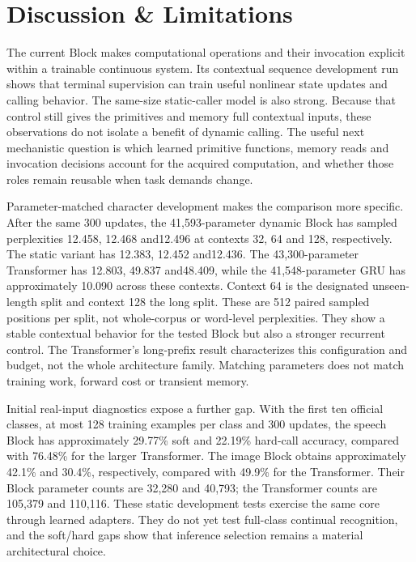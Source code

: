 \section{Discussion \& Limitations}
\label{sec:discussion}

The current Block makes computational operations and their invocation explicit
within a trainable continuous system. Its contextual sequence development run
shows that terminal supervision can train useful nonlinear state updates and
calling behavior. The same-size static-caller model is also strong. Because
that control still gives the primitives and memory full contextual inputs,
these observations do not isolate a benefit of dynamic calling. The useful
next mechanistic question is which learned primitive functions, memory reads
and invocation decisions account for the acquired computation, and whether
those roles remain reusable when task demands change.

Parameter-matched character development makes the comparison more specific.
After the same 300 updates, the 41,593-parameter dynamic Block has sampled
perplexities 12.458, 12.468 and12.496 at contexts 32, 64 and 128, respectively.
The static variant has 12.383, 12.452 and12.436. The 43,300-parameter Transformer
has 12.803, 49.837 and48.409, while the 41,548-parameter GRU has approximately
10.090 across these contexts. Context 64 is the designated unseen-length split
and context 128 the long split. These are 512 paired sampled positions per split,
not whole-corpus or word-level perplexities. They show a stable contextual
behavior for the tested Block but also a stronger recurrent control. The
Transformer's long-prefix result characterizes this configuration and budget,
not the whole architecture family. Matching parameters does not match
training work, forward cost or transient memory.

Initial real-input diagnostics expose a further gap. With the first ten
official classes, at most 128 training examples per class and 300 updates,
the speech Block has approximately 29.77\% soft and 22.19\% hard-call accuracy,
compared with 76.48\% for the larger Transformer. The image Block obtains
approximately 42.1\% and 30.4\%, respectively, compared with 49.9\% for the
Transformer. Their Block parameter counts are 32,280 and 40,793; the Transformer
counts are 105,379 and 110,116. These static development tests exercise the
same core through learned adapters. They do not yet test full-class continual
recognition, and the soft/hard gaps show that inference selection remains a
material architectural choice.

